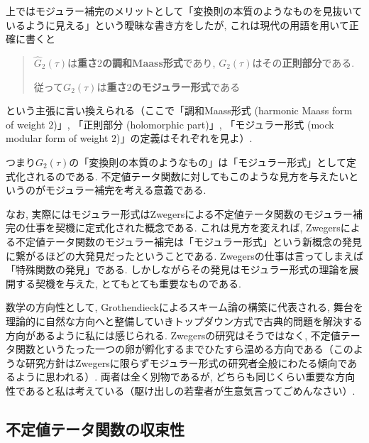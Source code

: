 \documentclass[11pt,b5paper,oneside,lualatex]{ltjsarticle} %
\numberwithin{equation}{section} %
\begin{document}
\begin{rem}{}{}
	上ではモジュラー補完のメリットとして「変換則の本質のようなものを見抜いているように見える」という曖昧な書き方をしたが, これは現代の用語を用いて正確に書くと
	\begin{quote}
		\centering
		$ \widehat{G}_2 (\tau) $は\textbf{重さ$ 2 $の調和Maass形式}であり, 
		$ G_2 (\tau) $はその\textbf{正則部分}である. 
		
		従って$ G_2 (\tau) $は\textbf{重さ$ 2 $のモジュラー形式}である
	\end{quote}
	という主張に言い換えられる（ここで「調和Maass形式 (harmonic Maass form of weight $ 2 $)」, 「正則部分 (holomorphic part)」, 「モジュラー形式 (mock modular form of weight $ 2 $)」の定義はそれぞれ\cite[Definition 4.2, Definition 4.4, Definition 5.16 i)]{BFOR}を見よ）. 
	
	つまり$ G_2 (\tau) $の「変換則の本質のようなもの」は「モジュラー形式」として定式化されるのである. 
	不定値テータ関数に対してもこのような見方を与えたいというのがモジュラー補完を考える意義である. 
	
	なお, 実際にはモジュラー形式はZwegersによる不定値テータ関数のモジュラー補完の仕事を契機に定式化された概念である. 
	これは見方を変えれば, Zwegersによる不定値テータ関数のモジュラー補完は「モジュラー形式」という新概念の発見に繋がるほどの大発見だったということである. 
	Zwegersの仕事は言ってしまえば「特殊関数の発見」である. 
	しかしながらその発見はモジュラー形式の理論を展開する契機を与えた, とてもとても重要なものである. 
	
	数学の方向性として, Grothendieckによるスキーム論の構築に代表される, 舞台を理論的に自然な方向へと整備していきトップダウン方式で古典的問題を解決する方向があるように私には感じられる. 
	Zwegersの研究はそうではなく, 不定値テータ関数というたった一つの卵が孵化するまでひたすら温める方向である（このような研究方針はZwegersに限らずモジュラー形式の研究者全般にわたる傾向であるように思われる）. 
	両者は全く別物であるが, どちらも同じくらい重要な方向性であると私は考えている（駆け出しの若輩者が生意気言ってごめんなさい）. 
\end{rem}



\subsection{不定値テータ関数の収束性} \label{subsec:indefinite_theta_convergency}
\end{document}
